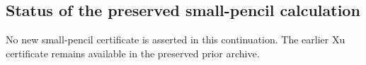 \subsection{Status of the preserved small-pencil calculation}

No new small-pencil certificate is asserted in this continuation. The earlier Xu certificate remains available in the preserved prior archive.
